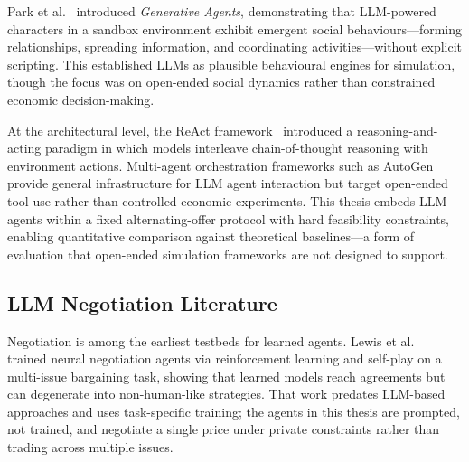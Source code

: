 Park et al.~\cite{park2023generative} introduced \emph{Generative Agents}, demonstrating that LLM-powered characters in a sandbox environment exhibit emergent social behaviours---forming relationships, spreading information, and coordinating activities---without explicit scripting.  This established LLMs as plausible behavioural engines for simulation, though the focus was on open-ended social dynamics rather than constrained economic decision-making.

At the architectural level, the ReAct framework~\cite{yao2023react} introduced a reasoning-and-acting paradigm in which models interleave chain-of-thought reasoning with environment actions.  Multi-agent orchestration frameworks such as AutoGen~\cite{wu2023autogen} provide general infrastructure for LLM agent interaction but target open-ended tool use rather than controlled economic experiments.  This thesis embeds LLM agents within a fixed alternating-offer protocol with hard feasibility constraints, enabling quantitative comparison against theoretical baselines---a form of evaluation that open-ended simulation frameworks are not designed to support.

\subsection{LLM Negotiation Literature}
\label{sec:rw_negotiation}

Negotiation is among the earliest testbeds for learned agents.  Lewis et al.~\cite{lewis2017dealornodeal} trained neural negotiation agents via reinforcement learning and self-play on a multi-issue bargaining task, showing that learned models reach agreements but can degenerate into non-human-like strategies.  That work predates LLM-based approaches and uses task-specific training; the agents in this thesis are prompted, not trained, and negotiate a single price under private constraints rather than trading across multiple issues.

